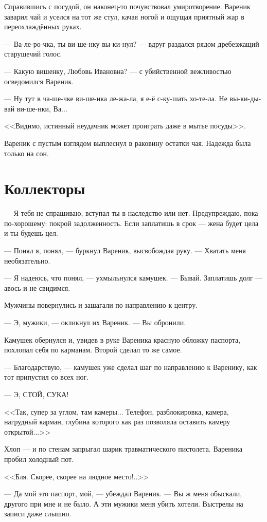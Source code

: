 \documentclass[a4paper,10pt,fleqn]{book}\usepackage{polyglossia}\setdefaultlanguage{english}\setotherlanguage{russian}\defaultfontfeatures{Ligatures=TeX,Mapping=tex-text} \usepackage{xcolor}\definecolor{lightgray}{HTML}{bbbbbb}\color{lightgray}\newcommand{\ml}[3]{\textcolor{black}{#3}}
\newcommand{\asterism}{\vspace{1em}{\centering\Large\bfseries$\ast~\ast~\ast$\par}\vspace{1em}}
\begin{document}
Справившись с посудой, он наконец-то почувствовал умиротворение.
Вареник заварил чай и уселся на тот же стул, качая ногой и ощущая приятный жар в переохлаждённых руках.

--- Ва-ле-ро-чка, ты ви-ше-нку вы-ки-нул? --- вдруг раздался рядом дребезжащий старушечий голос.

--- Какую вишенку, Любовь Ивановна? --- с убийственной вежливостью осведомился Вареник.

--- Ну тут в ча-ше-чке ви-ше-нка ле-жа-ла, я е-ё с-ку-шать хо-те-ла.
Не вы-ки-ды-вай ви-ше-нки, Ва...

<<Видимо, истинный неудачник может проиграть даже в мытье посуды>>.

Вареник с пустым взглядом выплеснул в раковину остатки чая.
Надежда была только на сон.

\section{Коллекторы}

--- Я тебя не спрашиваю, вступал ты в наследство или нет.
Предупреждаю, пока по-хорошему: покрой задолженность.
Если заплатишь в срок --- жена будет цела и ты будешь цел.

--- Понял я, понял, --- буркнул Вареник, высвобождая руку.
--- Хватать меня необязательно.

--- Я надеюсь, что понял, --- ухмыльнулся камушек.
--- Бывай.
Заплатишь долг --- авось и не свидимся.

Мужчины повернулись и зашагали по направлению к центру.

--- Э, мужики, --- окликнул их Вареник.
--- Вы обронили.

Камушек обернулся и, увидев в руке Вареника красную обложку паспорта, похлопал себя по карманам.
Второй сделал то же самое.

--- Благодарствую, --- камушек уже сделал шаг по направлению к Варенику, как тот припустил со всех ног.

--- Э, СТОЙ, СУКА!

<<Так, супер за углом, там камеры... Телефон, разблокировка, камера, нагрудный карман, глубина которого как раз позволяла оставить камеру открытой...>>

Хлоп --- и по стенам запрыгал шарик травматического пистолета.
Вареника пробил холодный пот.

<<Бля.
Скорее, скорее на людное место!..>>

\asterism

--- Да мой это паспорт, мой, --- убеждал Вареник.
--- Вы ж меня обыскали, другого при мне и не было.
А эти мужики меня убить хотели.
Выстрелы на записи даже слышно.
\end{document}
